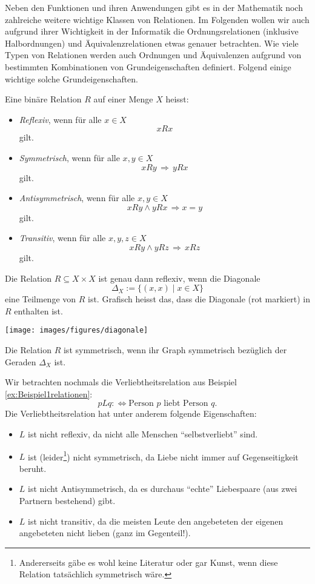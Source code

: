 Neben den Funktionen und ihren Anwendungen gibt es in der Mathematik noch zahlreiche weitere wichtige Klassen von Relationen. Im Folgenden wollen wir auch aufgrund ihrer Wichtigkeit in der Informatik die Ordnungsrelationen (inklusive Halbordnungen) und Äquivalenzrelationen etwas genauer betrachten. Wie viele Typen von Relationen werden auch Ordnungen und Äquivalenzen aufgrund von bestimmten Kombinationen von Grundeigenschaften definiert. Folgend einige wichtige solche Grundeigenschaften.


\begin{df}
    Eine binäre Relation $R$ auf einer Menge $X$ heisst:
    \begin{itemize}
    \item \textit{Reflexiv}, wenn für alle $x\in X$
    \[
    xRx
    \]
    gilt.
    \item \textit{Symmetrisch}, wenn für alle $x,y\in X$
    \[
    xRy\,\Rightarrow\, yRx
    \]
    gilt.
    \item \textit{Antisymmetrisch}, wenn für alle $x,y\in X$
    \[
    xRy\land yRx\,\Rightarrow x=y
    \]
    gilt.
    \item \textit{Transitiv}, wenn für alle $x,y,z\in X$
    \[
    xRy\land yRz\,\Rightarrow \, xRz
    \]
    gilt.
    \end{itemize}
    \end{df}


    \begin{rk}
    Die Relation $R\subseteq X\times X$ ist genau dann reflexiv, wenn die Diagonale
    \[
    \Delta_X:=\{(x,x)\mid x\in X \}
    \]
    eine Teilmenge von $R$ ist. Grafisch heisst das, dass die Diagonale (rot markiert) in $R$ enthalten ist.
    \begin{center}
    \texttt{[image: images/figures/diagonale]}
    \end{center}
    Die Relation $R$ ist symmetrisch, wenn ihr Graph symmetrisch bezüglich der Geraden $\Delta_X$ ist.
    \end{rk}


    \begin{bsp}
        Wir betrachten nochmals die Verliebtheitsrelation aus Beispiel \ref{ex:Beispiel1relationen}:
        \[
        pLq:\Leftrightarrow \text{Person $p$ liebt Person $q$.}
        \]
    Die Verliebtheitsrelation hat unter anderem folgende Eigenschaften:
    \begin{itemize}
        \item $L$ ist nicht reflexiv, da nicht alle Menschen ``selbstverliebt'' sind.
        \item $L$ ist (leider\footnote{Andererseits gäbe es wohl keine Literatur oder gar Kunst, wenn diese Relation tatsächlich symmetrisch wäre.}) nicht symmetrisch, da Liebe nicht immer auf Gegenseitigkeit beruht.
        \item $L$ ist nicht Antisymmetrisch, da es durchaus ``echte'' Liebespaare (aus zwei Partnern bestehend) gibt.
        \item $L$ ist nicht transitiv, da die meisten Leute den angebeteten der eigenen angebeteten nicht lieben (ganz im Gegenteil!).
    \end{itemize}
    \end{bsp}

